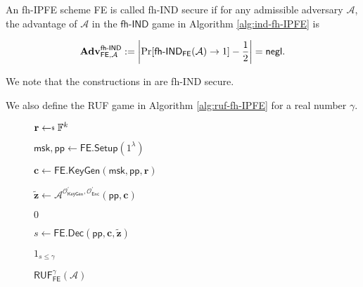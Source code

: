 \begin{definition}

	An fh-IPFE scheme \textsf{FE} is called fh-IND secure if for any admissible adversary $\mathcal{A}$, the advantage of $\mathcal{A}$ in the $\textsf{fh-IND}$ game in Algorithm \ref{alg:ind-fh-IPFE} is

\[
	\mathbf{Adv}_{\textsf{FE}, \mathcal{A}}^{\textsf{fh-IND}} := \left| \Pr[\textsf{fh-IND}_{\textsf{FE}}(\mathcal{A}) \to 1 ] - \frac{1}{2} \right| = \mathsf{negl}.
\]

\end{definition}

\noindent We note that the constructions in \cite{cryptoeprint:2015/1255, 10.1007/978-3-319-45871-7_24, cryptoeprint:2016/440} are fh-IND secure.

We also define the \textsf{RUF} game in Algorithm \ref{alg:ruf-fh-IPFE} for a real number $\gamma$.

\begin{figure}[h]
\centering

	\begin{minipage}[t]{0.55\textwidth}
	\begin{algorithm}[H]
	\caption{$\textsf{RUF}^\gamma_{\textsf{FE}}(\mathcal{A})$}
	\label{alg:ruf-fh-IPFE}
	\begin{algorithmic}[1]
		\State $\mathbf{r} \getsdollar \mathbb{F}^{k}$ \label{alg:ruf-fh-IPFE:r}

		\State $\textsf{msk}, \textsf{pp} \gets \textsf{FE.Setup}(1^\lambda)$

		\State $\mathbf{c} \gets \textsf{FE.KeyGen}(\textsf{msk}, \textsf{pp}, \mathbf{r})$

		\State $\mathbf{\tilde{z}} \gets \mathcal{A}^{\mathcal{O}^\prime_{\textsf{KeyGen}}, \mathcal{O}^\prime_{\textsf{Enc}} } ( \textsf{pp}, \mathbf{c} )$

			
			\State \Return $0$
		
		\EndIf

		\State $s \gets \textsf{FE.Dec}(\textsf{pp}, \mathbf{c}, \mathbf{\tilde{z}} )$

		\State \Return $1_{s \leq \gamma}$
	\end{algorithmic}
	\end{algorithm}
	\end{minipage}

\label{fig:ruf-fh-IPFE}
\end{figure}

